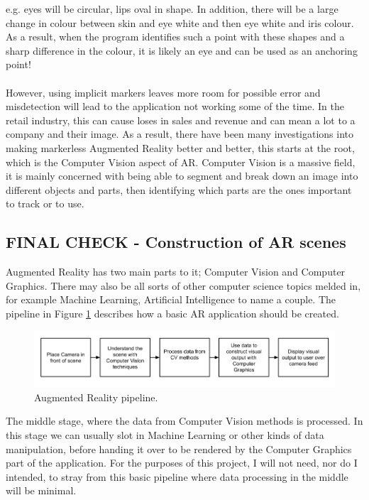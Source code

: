 \documentclass[11pt]{article}
\begin{document}
e.g. eyes will be circular, lips oval in shape. In addition, there will
be a large change in colour between skin and eye white and then eye white
and iris colour. As a result, when the program identifies such a point with 
these shapes and a sharp difference in the colour, it
is likely an eye and can be used as an anchoring point!\\
\\
However, using implicit markers leaves more room for possible error and
misdetection will lead to the application not working some of the
time. In the retail industry, this can cause loses in sales and revenue 
and can mean a lot to a company and their image. As a result, there
have been many investigations into making markerless Augmented Reality
better and better, this starts at the root, which is the Computer
Vision aspect of AR. Computer Vision is a massive field, it is
mainly concerned with being able to segment and break
down an image into different objects and parts, then identifying which
parts are the ones important to track or to use.

\subsection{FINAL CHECK - Construction of AR scenes}
Augmented Reality has two main parts to it; Computer Vision and Computer Graphics.
There may also be all sorts of other computer science topics melded in, for
example Machine Learning, Artificial Intelligence to name a couple. 
The pipeline in Figure \ref{fig:arpipeline} describes how a basic AR 
application should be created.\\

\begin{figure} 
	\includegraphics[scale=0.5]{pics/ARpipeline}
	\caption{Augmented Reality pipeline.}
	\label{fig:arpipeline}
\end{figure}

The middle stage, where the data from Computer Vision methods is processed. 
In this stage we can usually slot in Machine Learning or other kinds 
of data manipulation, before handing it over to be rendered by the Computer
Graphics part of the application. For the purposes of this project, I will not need,
nor do I intended, to stray from this basic pipeline where data processing in 
the middle will be minimal.
\end{document}
